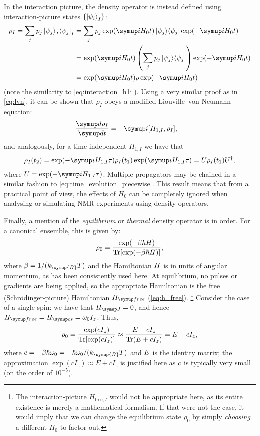 In the interaction picture, the density operator is instead defined using interaction-picture states $\{\ket{\psi_i}_I\}$:
\begin{align}
    \label{eq:density_matrix_interaction}
    \rho_I = \sum_j p_j \ket{\psi_j}_I \!\bra{\psi_j}_I
           &= \sum_j p_j \exp(\mi H_0 t)\ket{\psi_j}\!\bra{\psi_j} \exp(-\mi H_0 t) \notag \\
           &= \exp(\mi H_0 t) \left(\sum_j p_j \ket{\psi_j}\!\bra{\psi_j}\right) \exp(-\mi H_0 t) \notag \\
           &= \exp(\mi H_0 t) \rho \exp(-\mi H_0 t)
\end{align}
(note the similarity to \cref{eq:interaction_h1i}).
Using a very similar proof as in \cref{eq:lvn}, it can be shown that $\rho_I$ obeys a modified Liouville--von Neumann equation:
\begin{align}
    \label{eq:lvn_interaction}
    \frac{\md\rho_I}{\md t} &= -\mi[H_{1,I}, \rho_I],
\end{align}
and analogously, for a time-independent $H_{1,I}$ we have that
\begin{align}
    \label{eq:lvn_interaction_integrated}
    \rho_I(t_2) = \exp(-\mi H_{1,I}\tau)\rho_I(t_1)\exp(\mi H_{1,I}\tau) = U\rho_I(t_1) U^\dagger,
\end{align}
where $U = \exp(-\mi H_{1,I}\tau)$.
Multiple propagators may be chained in a similar fashion to \cref{eq:time_evolution_piecewise}.
This result means that from a practical point of view, the effects of $H_0$ can be completely ignored when analysing or simulating NMR experiments using density operators.

Finally, a mention of the \textit{equilibrium} or \textit{thermal} density operator is in order.
For a canonical ensemble, this is given by:
\begin{equation}
    \label{eq:thermal_density_operator}
    \rho_0 = \frac{\exp(-\beta\hbar H)}{\operatorname{Tr}[\exp(-\beta\hbar H)]},
\end{equation}
where $\beta = 1/(k_{\symup{B}}T)$ and the Hamiltonian $H\/$ is in units of angular momentum, as has been consistently used here.
At equilibrium, no pulses or gradients are being applied, so the appropriate Hamiltonian is the free (Schr\"odinger-picture) Hamiltonian $\Hfree$ (\cref{eq:h_free}).%
\footnote{The interaction-picture $H_{\text{free},I}$ would not be appropriate here, as its entire existence is merely a mathematical formalism. If that were not the case, it would imply that we can change the equilibrium state $\rho_0$ by simply \textit{choosing} a different $H_0$ to factor out.}
Consider the case of a single spin: we have that $\HJ = 0$, and hence $\Hfree = \Hcs = \omega_0 I_z$. Thus,
\begin{equation}
    \label{eq:nmr_equilibrium_rho}
    \rho_0 = \frac{\exp(cI_z)}{\operatorname{Tr}[\exp(cI_z)]} \approx \frac{E + cI_z}{\operatorname{Tr}(E + cI_z)} = E + cI_z,
\end{equation}
where $c = -\beta\hbar\omega_0 = -\hbar\omega_0/(k_{\symup{B}}T)$ and $E\/$ is the identity matrix; the approximation $\exp(cI_z) \approx E + cI_z$ is justified here as $c\/$ is typically very small (on the order of $10^{-5}$).

